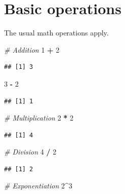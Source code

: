 \documentclass[openany]{book}
\newenvironment{Shaded}{\begin{snugshade}}{\end{snugshade}}
\newcommand{\CommentTok}[1]{\textcolor[rgb]{0.56,0.35,0.01}{\textit{#1}}}
\newcommand{\DecValTok}[1]{\textcolor[rgb]{0.00,0.00,0.81}{#1}}
\newcommand{\OperatorTok}[1]{\textcolor[rgb]{0.81,0.36,0.00}{\textbf{#1}}}
\newcommand{\StringTok}[1]{\textcolor[rgb]{0.31,0.60,0.02}{#1}}
\begin{document}
\hypertarget{basic-operations}{%
\section{Basic operations}\label{basic-operations}}

The usual math operations apply.

\begin{Shaded}
\begin{Highlighting}[]
\CommentTok{# Addition}
\DecValTok{1} \OperatorTok{+}\StringTok{ }\DecValTok{2} 
\end{Highlighting}
\end{Shaded}

\begin{verbatim}
## [1] 3
\end{verbatim}

\begin{Shaded}
\begin{Highlighting}[]
\DecValTok{3} \OperatorTok{-}\StringTok{ }\DecValTok{2}
\end{Highlighting}
\end{Shaded}

\begin{verbatim}
## [1] 1
\end{verbatim}

\begin{Shaded}
\begin{Highlighting}[]
\CommentTok{# Multiplication}
\DecValTok{2} \OperatorTok{*}\StringTok{ }\DecValTok{2}
\end{Highlighting}
\end{Shaded}

\begin{verbatim}
## [1] 4
\end{verbatim}

\begin{Shaded}
\begin{Highlighting}[]
\CommentTok{# Division}
\DecValTok{4} \OperatorTok{/}\StringTok{ }\DecValTok{2}
\end{Highlighting}
\end{Shaded}

\begin{verbatim}
## [1] 2
\end{verbatim}

\begin{Shaded}
\begin{Highlighting}[]
\CommentTok{# Exponentiation}
\DecValTok{2}\OperatorTok{^}\DecValTok{3}
\end{Highlighting}
\end{Shaded}
\end{document}
